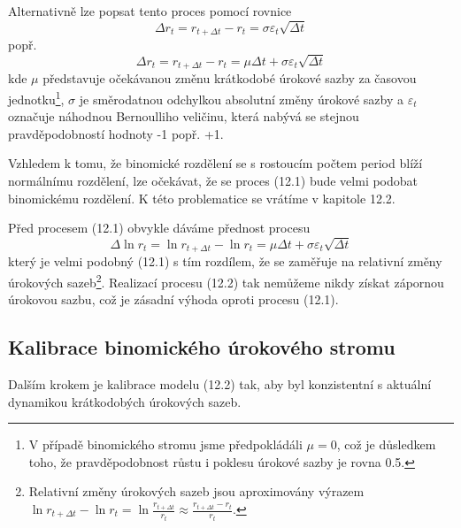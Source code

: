 \documentclass[a4paper]{book}
\begin{document}
Alternativně lze popsat tento proces pomocí rovnice
\begin{equation*}
\Delta r_t = r_{t + \Delta t} - r_t = \sigma \varepsilon_t \sqrt{\Delta t}
\end{equation*}
popř.
\begin{equation}
\Delta r_t = r_{t + \Delta t} - r_t = \mu \Delta t + \sigma \varepsilon_t \sqrt{\Delta t}
\end{equation}
kde $\mu$ představuje očekávanou změnu krátkodobé úrokové sazby za časovou jednotku\footnote{V případě binomického stromu jsme předpokládáli $\mu = 0$, což je důsledkem toho, že pravděpodobnost růstu i poklesu úrokové sazby je rovna 0.5.}, $\sigma$ je směrodatnou odchylkou absolutní změny úrokové sazby a $\varepsilon_t$ označuje náhodnou Bernoulliho veličinu, která nabývá se stejnou pravděpodobností hodnoty -1 popř. +1.

Vzhledem k tomu, že binomické rozdělení se s rostoucím počtem period blíží normálnímu rozdělení, lze očekávat, že se proces (12.1) bude velmi podobat binomickému rozdělení. K této problematice se vrátíme v kapitole 12.2.

Před procesem (12.1) obvykle dáváme přednost procesu
\begin{equation}
\Delta \ln r_t = \ln r_{t + \Delta t} - \ln r_t = \mu \Delta t + \sigma \varepsilon_t \sqrt{\Delta t}
\end{equation}
který je velmi podobný (12.1) s tím rozdílem, že se zaměřuje na relativní změny úrokových sazeb\footnote{Relativní změny úrokových sazeb jsou aproximovány výrazem $\ln r_{t + \Delta t} - \ln r_t = \ln \frac{r_{t + \Delta t}}{r_t} \approx \frac{r_{t + \Delta t} - r_t}{r_t}$.}. Realizací procesu (12.2) tak nemůžeme nikdy získat zápornou úrokovou sazbu, což je zásadní výhoda oproti procesu (12.1).

\subsection{Kalibrace binomického úrokového stromu}

Dalším krokem je kalibrace modelu (12.2) tak, aby byl konzistentní s aktuální dynamikou krátkodobých úrokových sazeb.
\end{document}
